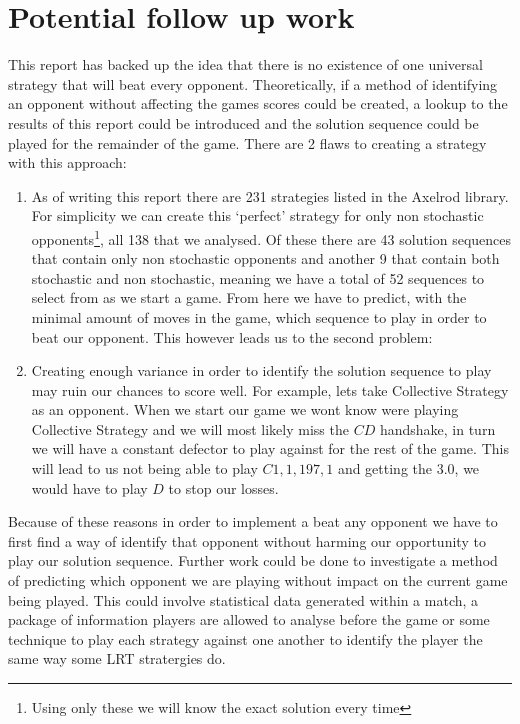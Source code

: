 \section{Potential follow up work}\label{sec:follow_up}
This report has backed up the idea that there is no existence of one universal strategy that will beat every opponent.
Theoretically, if a method of identifying an opponent without affecting the games scores could be created, a lookup to the results of this report could be introduced and the solution sequence could be played for the remainder of the game.
There are 2 flaws to creating a strategy with this approach:
\begin{enumerate}
    \item {As of writing this report there are 231 strategies listed in the Axelrod library.
    For simplicity we can create this `perfect' strategy for only non stochastic opponents\footnote{Using only these we will know the exact solution every time}, all 138 that we analysed.
    Of these there are 43 solution sequences that contain only non stochastic opponents and another 9 that contain both stochastic and non stochastic, meaning we have a total of 52 sequences to select from as we start a game.
    From here we have to predict, with the minimal amount of moves in the game, which sequence to play in order to beat our opponent.
    This however leads us to the second problem:}

    \item {Creating enough variance in order to identify the solution sequence to play may  ruin our chances to score well.
    For example, lets take Collective Strategy as an opponent.
    When we start our game we wont know were playing Collective Strategy and we will most likely miss the $CD$ handshake, in turn we will have a constant defector to play against for the rest of the game.
    This will lead to us not being able to play $C1,1,197,1$ and getting the $3.0$, we would have to play $D$ to stop our losses.}
\end{enumerate}

Because of these reasons in order to implement a beat any opponent we have to first find a way of identify that opponent without harming our opportunity to play our solution sequence. 
Further work could be done to investigate a method of predicting which opponent we are playing without impact on the current game being played.
This could involve statistical data generated within a match, a package of information players are allowed to analyse before the game or some technique to play each strategy against one another to identify the player the same way some LRT stratergies do.

